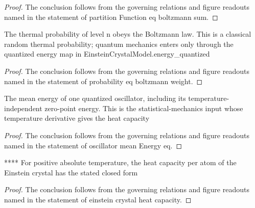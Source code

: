 \begin{proof}
  The conclusion follows from the governing relations and figure readouts named in the statement of partition Function eq boltzmann sum.
\end{proof}
\begin{theorem}
  \label{thm:physics:phyx-mini-0604:phyxmini0604-probability-eq-boltzmann-weight}
  The thermal probability of level n obeys the Boltzmann law. This is a classical random thermal probability; quantum mechanics enters only through the quantized energy map in EinsteinCrystalModel.energy\_quantized
\end{theorem}
\begin{proof}
  The conclusion follows from the governing relations and figure readouts named in the statement of probability eq boltzmann weight.
\end{proof}
\begin{theorem}
  \label{thm:physics:phyx-mini-0604:phyxmini0604-oscillator-meanenergy-eq}
  The mean energy of one quantized oscillator, including its temperature- independent zero-point energy. This is the statistical-mechanics input whose temperature derivative gives the heat capacity
\end{theorem}
\begin{proof}
  The conclusion follows from the governing relations and figure readouts named in the statement of oscillator mean Energy eq.
\end{proof}
\begin{theorem}
  \label{thm:physics:phyx-mini-0604:phyxmini0604-einstein-crystal-heat-capacity}
  **** For positive absolute temperature, the heat capacity per atom of the Einstein crystal has the stated closed form
\end{theorem}
\begin{proof}
  The conclusion follows from the governing relations and figure readouts named in the statement of einstein crystal heat capacity.
\end{proof}
